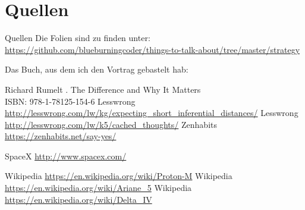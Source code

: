 \section{Quellen}
\begin{frame}{Quellen}
    Die Folien sind zu finden unter: \\
    \url{https://github.com/blueburningcoder/things-to-talk-about/tree/master/strategy}


    Das Buch, aus dem ich den Vortrag gebastelt hab:

    \begin{thebibliography}{10}
    \beamertemplatebookbibitems
        Richard Rumelt
        .
        \newblock The Difference and Why It Matters \\
                  ISBN: 978-1-78125-154-6
    \beamertemplatearticlebibitems
        Lesswrong
            \newblock \url{http://lesswrong.com/lw/kg/expecting\_short\_inferential\_distances/}
        Lesswrong
            \newblock \url{http://lesswrong.com/lw/k5/cached\_thoughts/}
        Zenhabits
            \newblock \url{https://zenhabits.net/say-yes/}


        SpaceX
            \newblock \url{http://www.spacex.com/}

        Wikipedia
            \newblock \url{https://en.wikipedia.org/wiki/Proton-M}
        Wikipedia
            \newblock \url{https://en.wikipedia.org/wiki/Ariane\_5}
        Wikipedia
            \newblock \url{https://en.wikipedia.org/wiki/Delta\_IV}
    \end{thebibliography}

\end{frame}


